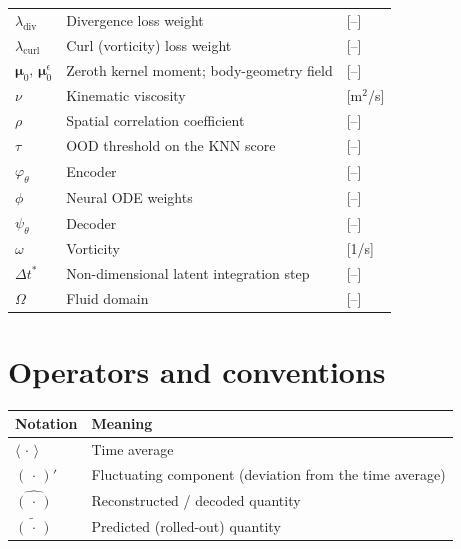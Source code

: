 \begin{longtable}{p{2.5cm}p{9cm}p{2.5cm}}
    $\lambda_\text{div}$ & Divergence loss weight                           & [--] \\
    $\lambda_\text{curl}$ & Curl (vorticity) loss weight                    & [--] \\
    $\boldsymbol{\mu}_0,\,\boldsymbol{\mu}_0^\epsilon$ & Zeroth kernel moment; body-geometry field & [--] \\
    $\nu$                & Kinematic viscosity                              & [m$^2$/s] \\
    $\rho$               & Spatial correlation coefficient                  & [--] \\
    $\tau$               & OOD threshold on the KNN score                   & [--] \\
    $\varphi_\theta$     & Encoder                                          & [--] \\
    $\phi$               & Neural ODE weights                               & [--] \\
    $\psi_\theta$        & Decoder                                          & [--] \\
    $\omega$             & Vorticity                                        & [1/s] \\
    $\Delta t^*$         & Non-dimensional latent integration step          & [--] \\
    $\Omega$             & Fluid domain                                     & [--] \\
    \bottomrule
\end{longtable}

\section*{Operators and conventions}

\begin{longtable}{p{2.5cm}p{10cm}}
    \toprule
    Notation & Meaning \\
    \midrule\endhead
    $\langle\,\cdot\,\rangle$ & Time average \\
    $(\,\cdot\,)'$            & Fluctuating component (deviation from the time average) \\
    $\hat{(\,\cdot\,)}$       & Reconstructed / decoded quantity \\
    $\tilde{(\,\cdot\,)}$     & Predicted (rolled-out) quantity \\
    \bottomrule
\end{longtable}